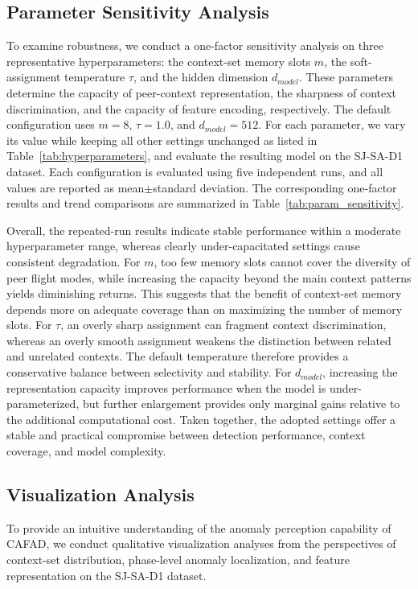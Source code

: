 \documentclass[iicol,pdflatex,sn-basic,Numbered]{sn-jnl}%
\theoremstyle{thmstyleone}%
\theoremstyle{thmstyletwo}%
\theoremstyle{thmstylethree}%
\begin{document}
\subsection{Parameter Sensitivity Analysis}

To examine robustness, we conduct a one-factor sensitivity analysis on three representative hyperparameters: the context-set memory slots $m$, the soft-assignment temperature $\tau$, and the hidden dimension $d_{model}$.
These parameters determine the capacity of peer-context representation, the sharpness of context discrimination, and the capacity of feature encoding, respectively.
The default configuration uses $m=8$, $\tau=1.0$, and $d_{model}=512$.
For each parameter, we vary its value while keeping all other settings unchanged as listed in Table~\ref{tab:hyperparameters}, and evaluate the resulting model on the SJ-SA-D1 dataset.
Each configuration is evaluated using five independent runs, and all values are reported as mean$\pm$standard deviation.
The corresponding one-factor results and trend comparisons are summarized in Table~\ref{tab:param_sensitivity}.

Overall, the repeated-run results indicate stable performance within a moderate hyperparameter range, whereas clearly under-capacitated settings cause consistent degradation.
For $m$, too few memory slots cannot cover the diversity of peer flight modes, while increasing the capacity beyond the main context patterns yields diminishing returns.
This suggests that the benefit of context-set memory depends more on adequate coverage than on maximizing the number of memory slots.
For $\tau$, an overly sharp assignment can fragment context discrimination, whereas an overly smooth assignment weakens the distinction between related and unrelated contexts.
The default temperature therefore provides a conservative balance between selectivity and stability.
For $d_{model}$, increasing the representation capacity improves performance when the model is under-parameterized, but further enlargement provides only marginal gains relative to the additional computational cost.
Taken together, the adopted settings offer a stable and practical compromise between detection performance, context coverage, and model complexity.

\subsection{Visualization Analysis}

To provide an intuitive understanding of the anomaly perception capability of CAFAD, we conduct qualitative visualization analyses from the perspectives of context-set distribution, phase-level anomaly localization, and feature representation on the SJ-SA-D1 dataset.
\end{document}
